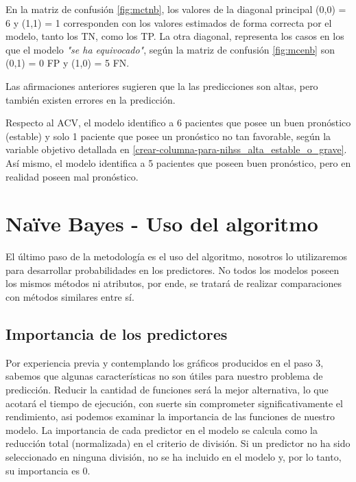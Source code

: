 	En la matriz de confusión \ref{fig:mctnb}, los valores de la diagonal principal (0,0) = 6 y (1,1) = 1 corresponden con los valores estimados de forma correcta por el modelo, tanto los TN, como los TP. La otra diagonal, representa los casos en los que el modelo \textit{"se ha equivocado"}, según la matriz de confusión \ref{fig:mcenb} son (0,1) = 0 FP y (1,0) = 5 FN.
\par Las afirmaciones anteriores sugieren que la las predicciones son altas, pero también existen errores en la predicción.
\par Respecto al ACV, el modelo identifico a 6 pacientes que posee un buen pronóstico (estable) y solo 1 paciente que posee un pronóstico no tan favorable, según la variable objetivo detallada en \ref{crear-columna-para-nihss_alta_estable_o_grave}. Así mismo, el modelo identifica a 5 pacientes que poseen buen pronóstico, pero en realidad poseen mal pronóstico.\\

    \hypertarget{nauxefve-bayes---uso-del-algoritmo}{%
\section{Naïve Bayes - Uso del algoritmo}\label{nauxefve-bayes---uso-del-algoritmo}}

	El último paso de la metodología es el uso del algoritmo, nosotros lo utilizaremos para desarrollar probabilidades en los predictores. No todos los modelos poseen los mismos métodos ni atributos, por ende, se tratará de realizar comparaciones con métodos similares entre sí.\\

    \hypertarget{importancia-de-los-predictores}{%
\subsection{Importancia de los predictores}\label{NBT:importancia-de-los-predictores}}

	Por experiencia previa y contemplando los gráficos producidos en el paso 3, sabemos que algunas características no son útiles para nuestro problema de predicción. Reducir la cantidad de funciones será la mejor alternativa, lo que acotará el tiempo de ejecución, con suerte sin comprometer significativamente el rendimiento, asi podemos examinar la importancia de las funciones de nuestro modelo. La importancia de cada predictor en el modelo se calcula como la reducción total (normalizada) en el criterio de división. Si un predictor no ha sido seleccionado en ninguna división, no se ha incluido en el modelo y, por lo tanto, su importancia es 0.\\

